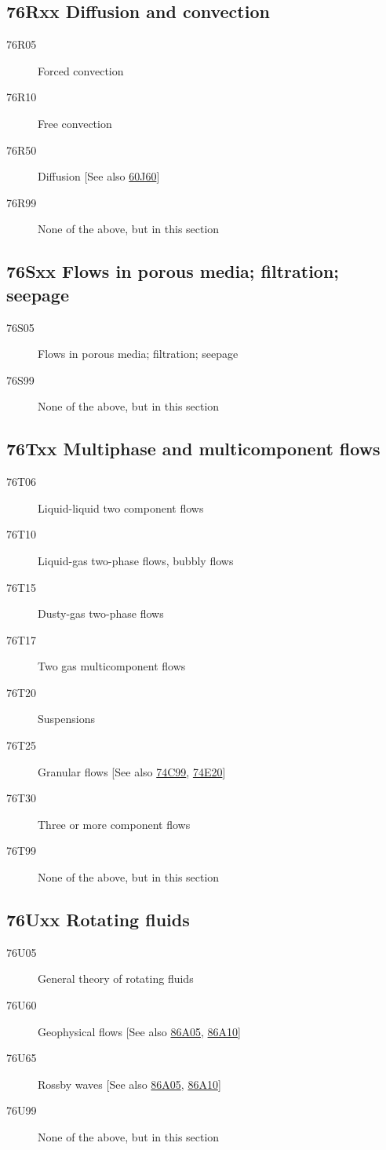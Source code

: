 \documentclass[letterpaper]{article}
\begin{document}
\subsection*{76Rxx  Diffusion and convection }\label{76Rxx}
\begin{description}  
\item [76R05]\label{76R05} Forced convection
\item [76R10]\label{76R10} Free convection
\item [76R50]\label{76R50} Diffusion [See also \hyperref[60J60]{60J60}]
\item [76R99]\label{76R99} None of the above, but in this section
\end{description}
\subsection*{76Sxx  Flows in porous media; filtration; seepage }\label{76Sxx}
\begin{description}  
\item [76S05]\label{76S05} Flows in porous media; filtration; seepage
\item [76S99]\label{76S99} None of the above, but in this section
\end{description}
\subsection*{76Txx  Multiphase and multicomponent flows }\label{76Txx}
\begin{description}  
\item [76T06]\label{76T06} Liquid-liquid two component flows
\item [76T10]\label{76T10} Liquid-gas two-phase flows, bubbly flows
\item [76T15]\label{76T15} Dusty-gas two-phase flows
\item [76T17]\label{76T17} Two gas multicomponent flows
\item [76T20]\label{76T20} Suspensions
\item [76T25]\label{76T25} Granular flows [See also \hyperref[74C99]{74C99}, \hyperref[74E20]{74E20}]
\item [76T30]\label{76T30} Three or more component flows
\item [76T99]\label{76T99} None of the above, but in this section
\end{description}
\subsection*{76Uxx  Rotating fluids }\label{76Uxx}
\begin{description}  
\item [76U05]\label{76U05} General theory of rotating fluids
\item [76U60]\label{76U60} Geophysical flows [See also \hyperref[86A05]{86A05}, \hyperref[86A10]{86A10}]
\item [76U65]\label{76U65} Rossby waves  [See also \hyperref[86A05]{86A05}, \hyperref[86A10]{86A10}]
\item [76U99]\label{76U99} None of the above, but in this section
\end{description}
\end{document}
